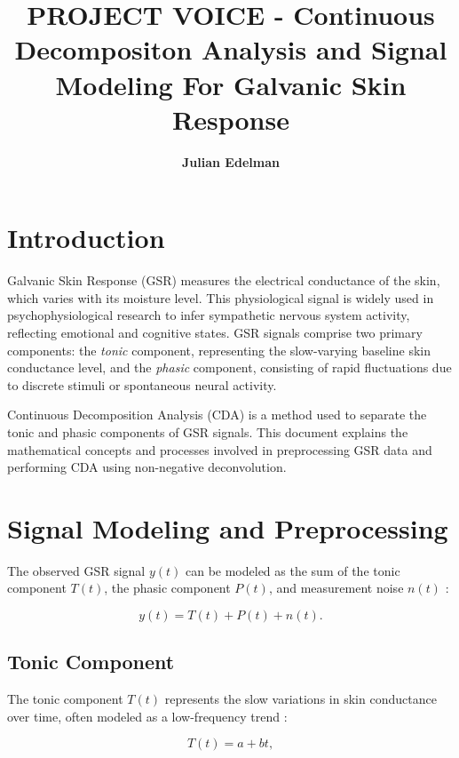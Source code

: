 \documentclass[twocolumn]{article}
\title{\textbf{PROJECT VOICE - Continuous Decompositon Analysis and Signal Modeling For Galvanic Skin Response}}
\author{\textbf{Julian Edelman}}
\begin{document}
\maketitle

\section*{Introduction}

Galvanic Skin Response (GSR) measures the electrical conductance of the skin, which varies with its moisture level. This physiological signal is widely used in psychophysiological research to infer sympathetic nervous system activity, reflecting emotional and cognitive states. GSR signals comprise two primary components: the \emph{tonic} component, representing the slow-varying baseline skin conductance level, and the \emph{phasic} component, consisting of rapid fluctuations due to discrete stimuli or spontaneous neural activity.

Continuous Decomposition Analysis (CDA) is a method used to separate the tonic and phasic components of GSR signals. This document explains the mathematical concepts and processes involved in preprocessing GSR data and performing CDA using non-negative deconvolution.

\section*{Signal Modeling and Preprocessing}

The observed GSR signal \( y(t) \) can be modeled as the sum of the tonic component \( T(t) \), the phasic component \( P(t) \), and measurement noise \( n(t) \) \cite{Dawson2007,Boucsein2012,Braithwaite2013}:

\begin{equation}
y(t) = T(t) + P(t) + n(t).
\end{equation}

\subsection*{Tonic Component}

The tonic component \( T(t) \) represents the slow variations in skin conductance over time, often modeled as a low-frequency trend \cite{Dawson2007,Boucsein2012}:

\begin{equation}
T(t) = a + b t,
\end{equation}
\end{document}

